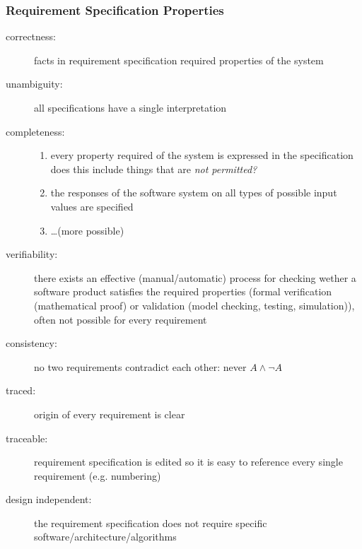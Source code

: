 \documentclass[a4paper, 10pt]{article}
\begin{document}
\subsubsection*{Requirement Specification Properties}
\begin{description}
	\item[correctness:] facts in requirement specification \follows required properties of the system
	\item[unambiguity:] all specifications have a single interpretation
	\item[completeness:] 
		\begin{enumerate}
			\item every property required of the system is expressed in the specification\\
			{\small does this include things that are \emph{not permitted?}}
			\item the responses of the software system on all types of possible input values are specified
			\item \dots {\small (more possible)}
		\end{enumerate}
	\item[verifiability:] there exists an effective (manual/automatic) process for checking wether a software product satisfies the required properties (formal verification (mathematical proof) or validation (model checking, testing, simulation)), often not possible for every requirement
	\item[consistency:] no two requirements contradict each other: never $A \wedge \neg A$
	\item[traced:] origin of every requirement is clear
	\item[traceable:] requirement specification is edited so it is easy to reference every single requirement (e.g. numbering)
	\item[design independent:] the requirement specification does not require specific software/architecture/algorithms
\end{description}
\end{document}
